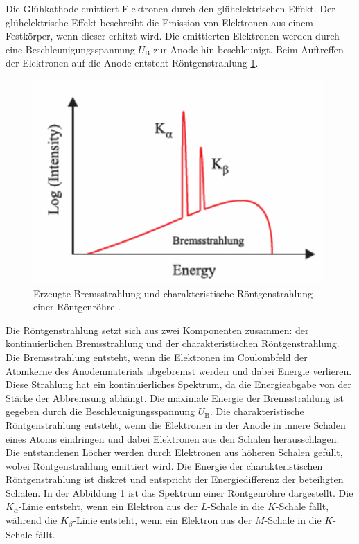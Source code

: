 Die Glühkathode emittiert Elektronen durch den glühelektrischen Effekt.
Der glühelektrische Effekt beschreibt die Emission von Elektronen aus einem Festkörper, wenn dieser erhitzt wird.
Die emittierten Elektronen werden durch eine Beschleunigungsspannung $U_\text{B}$ zur Anode hin beschleunigt.
Beim Auftreffen der Elektronen auf die Anode entsteht Röntgenstrahlung \ref{fig:spektrum}.
\begin{figure}[H]
    \centering
    \includegraphics[scale=0.5]{Bilder/spektrum.png}
    \caption{Erzeugte Bremsstrahlung und charakteristische Röntgenstrahlung einer Röntgenröhre \cite{als-nielsen2011}.}
    \label{fig:spektrum}
\end{figure}
Die Röntgenstrahlung setzt sich aus zwei Komponenten zusammen: 
der kontinuierlichen Bremsstrahlung und der charakteristischen Röntgenstrahlung.
Die Bremsstrahlung entsteht, wenn die Elektronen im Coulombfeld der Atomkerne des Anodenmaterials abgebremst werden und dabei Energie verlieren.
Diese Strahlung hat ein kontinuierliches Spektrum, da die Energieabgabe von der Stärke der Abbremsung abhängt.
Die maximale Energie der Bremsstrahlung ist gegeben durch die Beschleunigungsspannung $U_\text{B}$.
Die charakteristische Röntgenstrahlung entsteht, wenn die Elektronen in der Anode in innere Schalen
eines Atoms eindringen und dabei Elektronen aus den Schalen herausschlagen.
Die entstandenen Löcher werden durch Elektronen aus höheren Schalen gefüllt, wobei Röntgenstrahlung emittiert wird.
Die Energie der charakteristischen Röntgenstrahlung ist diskret und entspricht der Energiedifferenz der beteiligten Schalen.
In der Abbildung \ref{fig:spektrum} ist das Spektrum einer Röntgenröhre dargestellt. 
Die $K_\alpha$-Linie entsteht, wenn ein Elektron aus der $L$-Schale in die $K$-Schale fällt, 
während die $K_\beta$-Linie entsteht, wenn ein Elektron aus der $M$-Schale in die $K$-Schale fällt.

